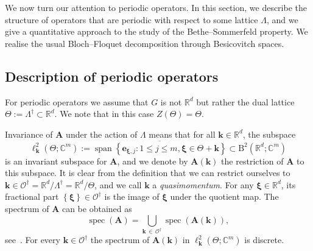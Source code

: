 \documentclass[AHL,Unicode,longabstracts,published]{cedram}
\DeclareMathOperator{\spann}{span}
\DeclareMathOperator{\spec}{spec}
\newcommand{\RB}{\mathrm{B}}
\newcommand{\R}{\mathbb R}
\newcommand{\C}{\mathbb C}
\newcommand{\CO}{\mathcal{O}}
\newcommand{\bxi}{\boldsymbol \xi}
\newcommand{\BA}{\mathbf A}
\newcommand{\be}{\mathbf e}
\newcommand{\bk}{\mathbf k}
\newcommand{\set}[1]{\left\{ #1 \right\}}
\begin{document}
We now turn our attention to periodic operators. In this section, we describe the structure of operators that are periodic with respect to some lattice $\Lambda$, and we give a quantitative approach to the study of the Bethe--Sommerfeld property. We realise the usual Bloch--Floquet decomposition through Besicovitch spaces.


\subsection{Description of periodic operators}
For periodic operators we assume that $G$ is not $\R^d$ but rather the dual lattice $\Theta := \Lambda^\dagger \subset \R^d$. We note that in this case $Z(\Theta) = \Theta$.

Invariance of $\BA$ under the action of $\Lambda$ means that for all $\bk \in \R^d$, the subspace
\begin{equation}\label{eq:invsubspace}
\ell^2_\bk(\Theta;\C^m) := \overline{\spann \set{\be_{\bxi,j} : 1 \le j \le m, \bxi \in
\Theta + \bk} } \subset \RB^2\left(\R^d;\C^m\right)
\end{equation}
is an invariant subspace for $\BA$, and we denote by $\BA(\bk)$ the restriction of $\BA$ to this subspace. It is clear from the definition that we can restrict ourselves to $\bk \in \CO^\dagger = \R^d/\Lambda^\dagger = \R^d/\Theta$, and we call $\bk$ a
\emph{quasimomentum}. For any $\bxi \in \R^d$, its fractional part $\set \bxi \in
\CO^\dagger$ is the image of $\bxi$ under the quotient map. The spectrum of $\BA$ can be obtained as
\begin{equation}
\spec(\BA) = \bigcup_{\bk\,\in\,\CO^\dagger} \spec(\BA(\bk)),
\end{equation}
see~\cite[Theorem~4.5.1]{ Kuchment}. For every $\bk \in \CO^\dagger$ the spectrum of $\BA(\bk)$ in $\ell^2_\bk(\Theta;\C^m)$ is discrete.
\end{document}
